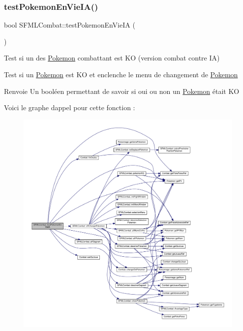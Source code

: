 \subsubsection{\texorpdfstring{test\+Pokemon\+En\+Vie\+I\+A()}{testPokemonEnVieIA()}}
{\footnotesize\ttfamily bool S\+F\+M\+L\+Combat\+::test\+Pokemon\+En\+Vie\+IA (\begin{DoxyParamCaption}{ }\end{DoxyParamCaption})\hspace{0.3cm}{\ttfamily [private]}}



Test si un des \hyperlink{class_pokemon}{Pokemon} combattant est KO (version combat contre IA) 

Test si un \hyperlink{class_pokemon}{Pokemon} est KO et enclenche le menu de changement de \hyperlink{class_pokemon}{Pokemon} \begin{DoxyReturn}{Renvoie}
Un booléen permettant de savoir si oui ou non un \hyperlink{class_pokemon}{Pokemon} était KO 
\end{DoxyReturn}
Voici le graphe d\textquotesingle{}appel pour cette fonction \+:\nopagebreak
\begin{figure}[H]
\begin{center}
\leavevmode
\includegraphics[width=350pt]{class_s_f_m_l_combat_a97bf8a2d3300663aacbb8899bbbf3472_cgraph}
\end{center}
\end{figure}
